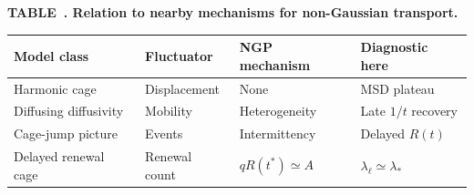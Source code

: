 \documentclass[aps,preprint,onecolumn,superscriptaddress,nofootinbib]{revtex4-2}
\begin{document}
\begin{center}
\label{tab:comparison}
\textbf{TABLE~\thetable. Relation to nearby mechanisms for non-Gaussian
transport.}

\begin{tabular}{llll}
Model class & Fluctuator & NGP mechanism & Diagnostic here \\
\hline
Harmonic cage & Displacement & None & MSD plateau \\
Diffusing diffusivity & Mobility & Heterogeneity & Late $1/t$ recovery \\
Cage-jump picture & Events & Intermittency & Delayed $R(t)$ \\
Delayed renewal cage & Renewal count & $qR(t^\ast)\simeq A$ & $\lambda_\ell\simeq\lambda_\ast$ \\
\end{tabular}
\end{center}



\end{document}
